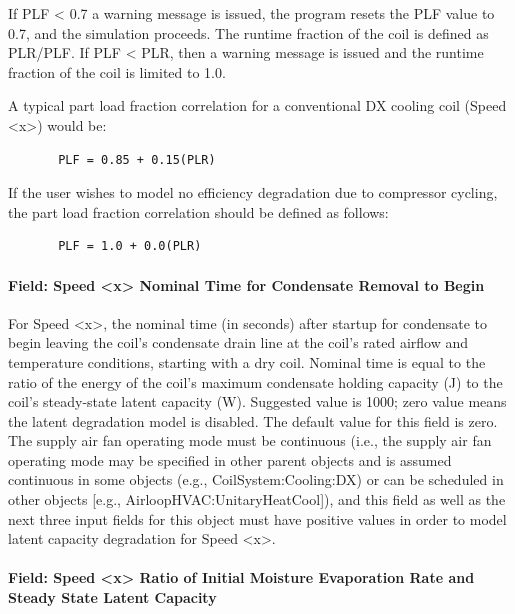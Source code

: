 If PLF \textless{} 0.7 a warning message is issued, the program resets the PLF value to 0.7, and the simulation proceeds. The runtime fraction of the coil is defined as PLR/PLF. If PLF \textless{} PLR, then a warning message is issued and the runtime fraction of the coil is limited to 1.0.

A typical part load fraction correlation for a conventional DX cooling coil (Speed \textless{}x\textgreater{}) would be:

\begin{lstlisting}
       PLF = 0.85 + 0.15(PLR)
\end{lstlisting}

If the user wishes to model no efficiency degradation due to compressor cycling, the part load fraction correlation should be defined as follows:

\begin{lstlisting}
       PLF = 1.0 + 0.0(PLR)
\end{lstlisting}

\paragraph{Field: Speed \textless{}x\textgreater{} Nominal Time for Condensate Removal to Begin}\label{field-speed-x-nominal-time-for-condensate-removal-to-begin}

For Speed \textless{}x\textgreater{}, the nominal time (in seconds) after startup for condensate to begin leaving the coil's condensate drain line at the coil's rated airflow and temperature conditions, starting with a dry coil. Nominal time is equal to the ratio of the energy of the coil's maximum condensate holding capacity (J) to the coil's steady-state latent capacity (W). Suggested value is 1000; zero value means the latent degradation model is disabled. The default value for this field is zero. The supply air fan operating mode must be continuous (i.e., the supply air fan operating mode may be specified in other parent objects and is assumed continuous in some objects (e.g., CoilSystem:Cooling:DX) or can be scheduled in other objects {[}e.g., AirloopHVAC:UnitaryHeatCool{]}), and this field as well as the next three input fields for this object must have positive values in order to model latent capacity degradation for Speed \textless{}x\textgreater{}.

\paragraph{Field: Speed \textless{}x\textgreater{} Ratio of Initial Moisture Evaporation Rate and Steady State Latent Capacity}\label{field-speed-x-ratio-of-initial-moisture-evaporation-rate-and-steady-state-latent-capacity}

